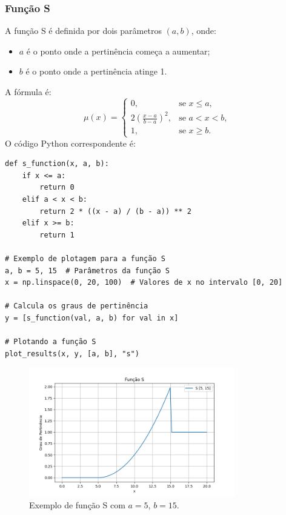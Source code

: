 \documentclass[a4paper,12pt]{article}
\begin{document}
\subsubsection{Função S}
A função S é definida por dois parâmetros $(a, b)$, onde:
\begin{itemize}
    \item $a$ é o ponto onde a pertinência começa a aumentar;
    \item $b$ é o ponto onde a pertinência atinge 1.
\end{itemize}
A fórmula é:
\[
\mu(x) =
\begin{cases}
0, & \text{se } x \leq a, \\
2\left(\frac{x - a}{b - a}\right)^2, & \text{se } a < x < b, \\
1, & \text{se } x \geq b.
\end{cases}
\]
O código Python correspondente é:
\begin{verbatim}
def s_function(x, a, b):
    if x <= a:
        return 0
    elif a < x < b:
        return 2 * ((x - a) / (b - a)) ** 2
    elif x >= b:
        return 1

# Exemplo de plotagem para a função S
a, b = 5, 15  # Parâmetros da função S
x = np.linspace(0, 20, 100)  # Valores de x no intervalo [0, 20]

# Calcula os graus de pertinência
y = [s_function(val, a, b) for val in x]

# Plotando a função S
plot_results(x, y, [a, b], "s")

\end{verbatim}
\begin{figure}[H]
    \centering
    \includegraphics[width=0.8\textwidth]{img/s.png}
    \caption{Exemplo de função S com $a=5$, $b=15$.}
\end{figure}
\end{document}

